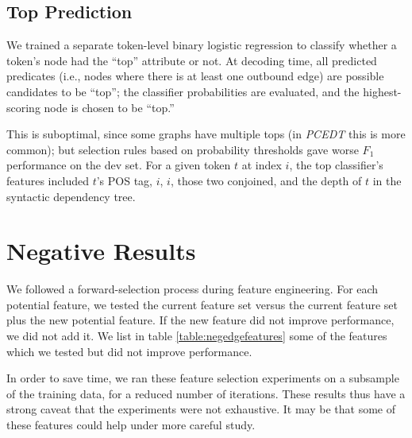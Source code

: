 \documentclass[11pt]{article}
\newcommand{\bocomment}[1]{\textcolor{Bittersweet}{[#1 -BTO]}}
\newcommand{\jmf}[1]{\textcolor{orange}{[#1 -JMF]}}
\renewcommand{\bocomment}[1]{}
\renewcommand{\jmf}[1]{}
\newcommand{\codenote}[1]{}
\begin{document}
\subsection{Top Prediction} \label{s:top_model}

\bocomment{may15 afternoon: The below describes how top pred works in LogitEdge.  Jeff, please confirm this is how you use the topness classifier, or modify appropriately.}\jmf{yes, this is correct for the graph parser}

We trained a separate token-level binary logistic regression to classify
whether a token's node had the ``top'' attribute or not.
At decoding time, all predicted predicates (i.e., nodes where there is at least one outbound edge)
are possible candidates to be ``top'';
the classifier probabilities are evaluated, and the highest-scoring node is
chosen to be ``top.''
\codenote{LogitEdge: MyGraph::decideTops()}
This is suboptimal, since some graphs have multiple tops (in \emph{PCEDT} this is
more common);
but selection rules based on probability thresholds gave worse $F_1$
performance on the dev set. \codenote{\url{https://github.com/Noahs-ARK/semeval-2014/issues/37}}
For a given token $t$ at index $i$, the top classifier's features
included $t$'s POS tag, $i$, $i$, those two conjoined, and the depth
of $t$ in the syntactic dependency tree.


\section{Negative Results}
\label{s:badfeatures}

We followed a forward-selection process during feature engineering.
For each potential feature, we tested the current feature set versus the current
feature set plus the new potential feature.
If the new feature did not improve performance, we did not add it.
We list in table \ref{table:negedgefeatures} some of the features which we tested but did not improve
performance.

In order to save time, we ran these feature selection experiments
on a subsample of the training data, for a reduced number of iterations.
These results thus have a 
 strong caveat that the experiments were
not exhaustive.  It may be that some of these features could help under more careful study.
\end{document}
